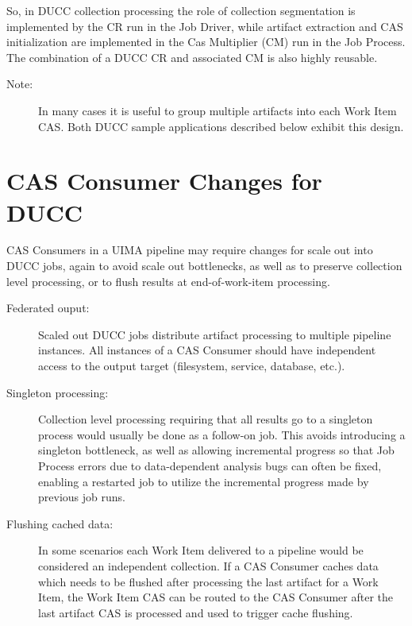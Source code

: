 So, in DUCC collection processing the role of collection segmentation is
implemented by the CR run in the Job Driver, while
artifact extraction and CAS initialization are implemented in the Cas Multiplier
(CM) run in the Job Process. The combination of a DUCC CR and associated CM 
is also highly reusable. 

\begin{description}
    \item[Note:] In many cases it is useful to group multiple artifacts into each
      Work Item CAS. Both DUCC sample applications described below exhibit this design.
\end{description}

\section{CAS Consumer Changes for DUCC}

CAS Consumers in a UIMA pipeline may require changes for scale out into DUCC
jobs, again to avoid scale out bottlenecks, as well as to preserve collection level
processing, or to flush results at end-of-work-item processing.
   
	\begin{description}
	    \item[Federated ouput:] Scaled out DUCC jobs distribute artifact processing
	    to multiple pipeline instances. All instances of a CAS Consumer should have
	    independent access to the output target (filesystem, service, database, etc.).
	    \item[Singleton processing:] Collection level processing
	    requiring that all results go to a singleton process would usually be done as a 
            follow-on job.
	    This avoids introducing a singleton bottleneck, as well as allowing
	    incremental progress so that Job Process errors due to data-dependent analysis bugs
	    can often be fixed, enabling a restarted job to utilize the incremental progress made by
	    previous job runs.
	    \item[Flushing cached data:] In some scenarios each Work Item delivered to a
	    pipeline would be considered an independent collection. If a CAS Consumer
	    caches data which needs to be flushed after processing the
	    last artifact for a Work Item, the Work Item CAS can be routed to the CAS Consumer after
	    the last artifact CAS is processed and used to trigger cache flushing.
	\end{description}


